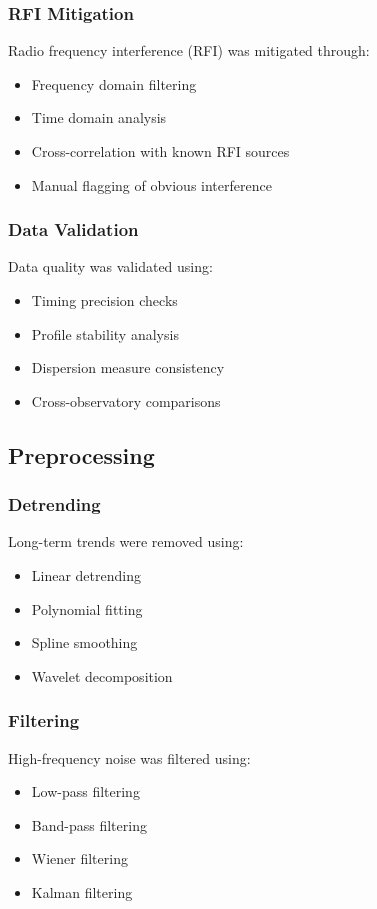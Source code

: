 \subsubsection{RFI Mitigation}
Radio frequency interference (RFI) was mitigated through:
\begin{itemize}
    \item Frequency domain filtering
    \item Time domain analysis
    \item Cross-correlation with known RFI sources
    \item Manual flagging of obvious interference
\end{itemize}

\subsubsection{Data Validation}
Data quality was validated using:
\begin{itemize}
    \item Timing precision checks
    \item Profile stability analysis
    \item Dispersion measure consistency
    \item Cross-observatory comparisons
\end{itemize}

\subsection{Preprocessing}

\subsubsection{Detrending}
Long-term trends were removed using:
\begin{itemize}
    \item Linear detrending
    \item Polynomial fitting
    \item Spline smoothing
    \item Wavelet decomposition
\end{itemize}

\subsubsection{Filtering}
High-frequency noise was filtered using:
\begin{itemize}
    \item Low-pass filtering
    \item Band-pass filtering
    \item Wiener filtering
    \item Kalman filtering
\end{itemize}

